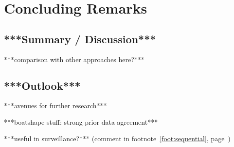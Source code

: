 \chapter{Concluding Remarks}
\label{cha:concluding}


\section{***Summary / Discussion***}

***comparison with other approaches here?***



\section{***Outlook***}

***avenues for further research***

***boatshape stuff: strong prior-data agreement***

***useful in surveillance?*** (comment in footnote~\ref{foot:sequential}, page~\pageref{foot:sequential})

